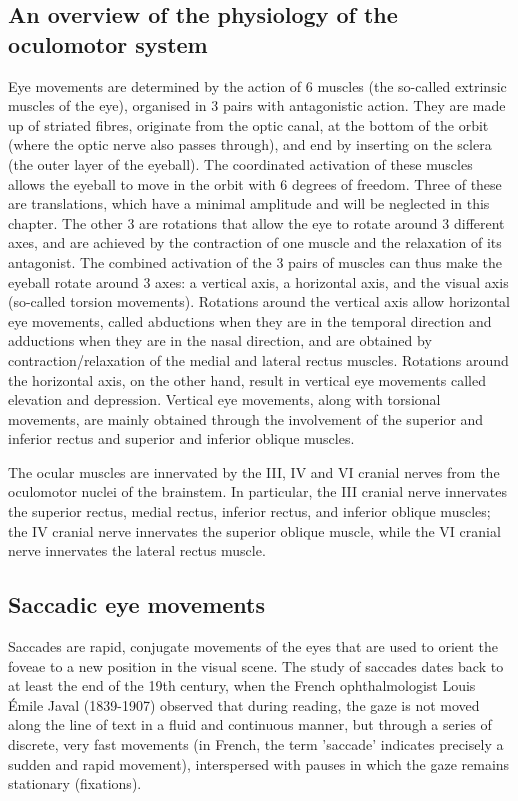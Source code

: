 \documentclass[11pt]{article}
\begin{document}
\subsection{An overview of the physiology of the oculomotor system}
Eye movements are determined by the action of 6 muscles (the so-called extrinsic muscles of the eye), organised in 3 pairs with antagonistic action. They are made up of striated fibres, originate from the optic canal, at the bottom of the orbit (where the optic nerve also passes through), and end by inserting on the sclera (the outer layer of the eyeball). The coordinated activation of these muscles allows the eyeball to move in the orbit with 6 degrees of freedom. Three of these are translations, which have a minimal amplitude and will be neglected in this chapter. The other 3 are rotations that allow the eye to rotate around 3 different axes, and are achieved by the contraction of one muscle and the relaxation of its antagonist. The combined activation of the 3 pairs of muscles can thus make the eyeball rotate around 3 axes: a vertical axis, a horizontal axis, and the visual axis (so-called torsion movements). Rotations around the vertical axis allow horizontal eye movements, called abductions when they are in the temporal direction and adductions when they are in the nasal direction, and are obtained by contraction/relaxation of the medial and lateral rectus muscles. Rotations around the horizontal axis, on the other hand, result in vertical eye movements called elevation and depression. Vertical eye movements, along with torsional movements, are mainly obtained through the involvement of the superior and inferior rectus and superior and inferior oblique muscles.

The ocular muscles are innervated by the III, IV and VI cranial nerves from the oculomotor nuclei of the brainstem. In particular, the III cranial nerve innervates the superior rectus, medial rectus, inferior rectus, and inferior oblique muscles; the IV cranial nerve innervates the superior oblique muscle, while the VI cranial nerve innervates the lateral rectus muscle.

\subsection{Saccadic eye movements}
Saccades are rapid, conjugate movements of the eyes that are used to orient the foveae to a new position in the visual scene. The study of saccades dates back to at least the end of the 19th century, when the French ophthalmologist Louis Émile Javal (1839-1907) observed that during reading, the gaze is not moved along the line of text in a fluid and continuous manner, but through a series of discrete, very fast movements (in French, the term 'saccade' indicates precisely a sudden and rapid movement), interspersed with pauses in which the gaze remains stationary (fixations).
\end{document}
